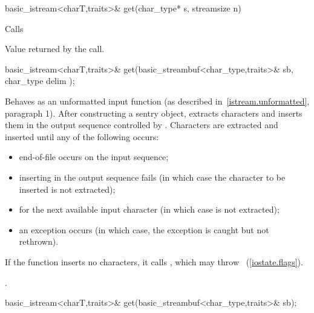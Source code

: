 %
%
\begin{itemdecl}
basic_istream<charT,traits>& get(char_type* s, streamsize n)
\end{itemdecl}

\begin{itemdescr}
\pnum
\effects
Calls

\pnum
\returns
Value returned by the call.
\end{itemdescr}

%
%
\begin{itemdecl}
basic_istream<charT,traits>& get(basic_streambuf<char_type,traits>& sb,
                  char_type delim );
\end{itemdecl}

\begin{itemdescr}
\pnum
\effects
Behaves as an unformatted input function
(as described in~\ref{istream.unformatted}, paragraph 1).
After constructing a sentry object, extracts
characters and inserts them
in the output sequence controlled by
.
Characters are extracted and inserted until any of the following occurs:
\begin{itemize}
\item
end-of-file occurs on the input sequence;
\item
inserting in the output sequence fails
(in which case the character to be inserted is not extracted);
\item
{} for the next available input
character 
(in which case  is not extracted);
\item
an exception occurs
(in which case, the exception is caught but not rethrown).
\end{itemize}

\pnum
If the function inserts no characters, it calls
,
which may throw
~(\ref{iostate.flags}).

\pnum
\returns
{}.
\end{itemdescr}

%
%
\begin{itemdecl}
basic_istream<charT,traits>& get(basic_streambuf<char_type,traits>& sb);
\end{itemdecl}


